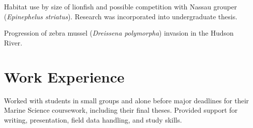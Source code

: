 \documentclass[a4paper]{deedy-resume} %
\begin{document}
Habitat use by size of lionfish and possible competition with Nassau grouper (\textit{Epinephelus striatus}). Research was incorporated into undergraduate thesis.

\sectionspace %



Progression of zebra mussel (\textit{Dreissena polymorpha}) invasion in the Hudson River.

\sectionspace %
\sectionspace



\section{Work Experience}



Worked with students in small groups and alone before major deadlines for their Marine Science coursework, including their final theses. Provided support for writing, presentation, field data handling, and study skills.

\sectionspace




\newpage %


\sectionspace

\end{document}
